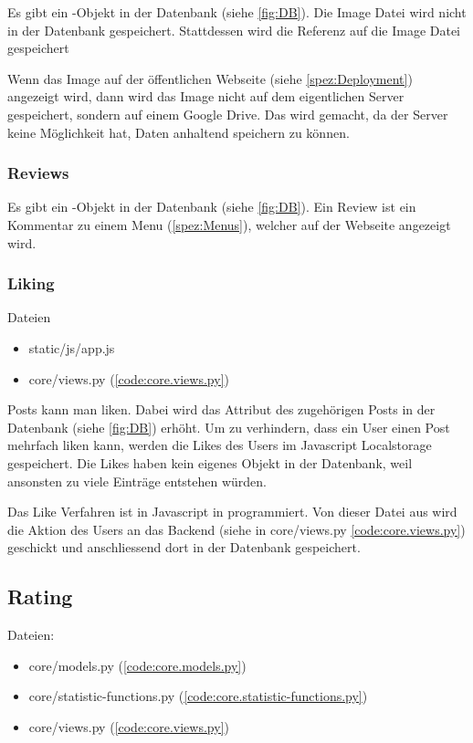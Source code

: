 Es gibt ein -Objekt in der Datenbank (siehe \ref{fig:DB}). Die Image
Datei wird nicht in der Datenbank gespeichert. Stattdessen wird die Referenz auf
die Image Datei gespeichert

Wenn das Image auf der öffentlichen Webseite (siehe \ref{spez:Deployment})
angezeigt wird, dann wird das Image nicht auf dem eigentlichen Server
gespeichert, sondern auf einem Google Drive. Das wird gemacht, da der Server
keine Möglichkeit hat, Daten anhaltend speichern zu können.

\subsubsection{Reviews} \label{spez:Reviews}

Es gibt ein -Objekt in der Datenbank (siehe \ref{fig:DB}). Ein
Review ist ein Kommentar zu einem Menu (\ref{spez:Menus}), welcher auf der
Webseite angezeigt wird.

\subsubsection{Liking} \label{spez:Liking} 
Dateien
\begin{itemize}
    \item static/js/app.js
    \item core/views.py (\ref{code:core.views.py})
\end{itemize}

Posts kann man liken. Dabei wird das  Attribut des zugehörigen Posts
in der Datenbank (siehe \ref{fig:DB}) erhöht. Um zu verhindern, dass ein User
einen Post mehrfach liken kann, werden die Likes des Users im Javascript
Localstorage gespeichert. Die Likes haben kein eigenes Objekt in der Datenbank,
weil ansonsten zu viele Einträge entstehen würden.

Das Like Verfahren ist in Javascript in  programmiert.
Von dieser Datei aus wird die Aktion des Users an das Backend (siehe 
in core/views.py \ref{code:core.views.py}) geschickt und anschliessend dort in
der Datenbank gespeichert.

\subsection{Rating} \label{spez:Rating}

Dateien:
\begin{itemize}
    \item core/models.py (\ref{code:core.models.py})
    \item core/statistic-functions.py (\ref{code:core.statistic-functions.py})
    \item core/views.py (\ref{code:core.views.py})
\end{itemize}

